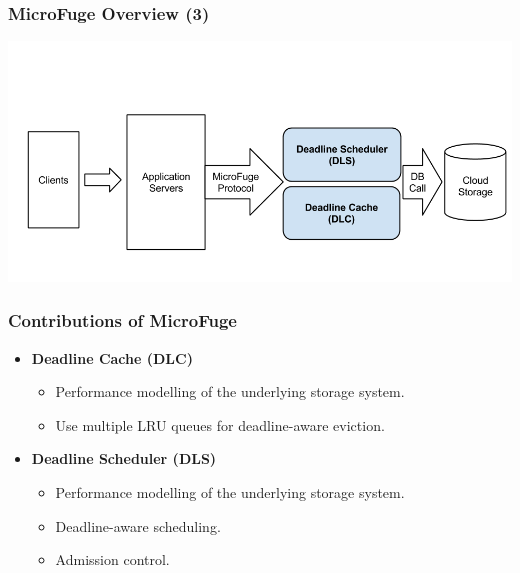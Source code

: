 \documentclass{beamer}
\newcommand{\myv}{\vspace{3 mm}}
\begin{document}
\begin{frame}
  \frametitle{MicroFuge Overview (3)}
  \vspace{-10 mm}
  \begin{center}
  \includegraphics[scale=0.32]{img/MF_FULL_NEW_3.png}
  \end{center}
\end{frame}



\begin{frame}
  \frametitle{Contributions of MicroFuge}
  \vspace{-10 mm}
  \begin{itemize}
  \item \textbf{Deadline Cache (DLC)}
    \myv
    \begin{itemize}
    \item Performance modelling of the underlying storage system.
      \myv
    \item Use multiple LRU queues for deadline-aware eviction.
    \end{itemize}
    \myv
  \item \textbf{Deadline Scheduler (DLS)}
    \begin{itemize}
      \myv
    \item Performance modelling of the underlying storage system.
      \myv
    \item Deadline-aware scheduling.
      \myv
    \item \textcolor[gray]{0.5} {Admission control}.
    \end{itemize}
  \end{itemize}
\end {frame}
\end{document}

